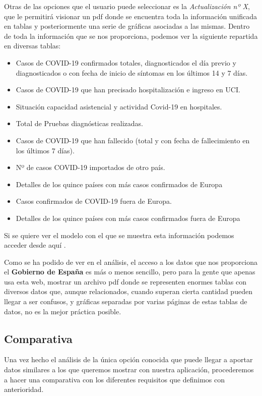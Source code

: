 Otras de las opciones que el usuario puede seleccionar es la \textit{Actualización nº X}, que le permitirá visionar un pdf donde se encuentra toda la información unificada en tablas y posteriormente una serie de gráficas asociadas a las mismas. Dentro de toda la información que se nos proporciona, podemos ver la siguiente repartida en diversas tablas:

\begin{itemize}
	\item Casos de COVID-19 confirmados totales, diagnosticados el día previo y diagnosticados o con fecha de inicio de síntomas en los últimos 14 y 7 días.
	\item Casos de COVID-19 que han precisado hospitalización e ingreso en UCI. 
	\item Situación capacidad asistencial y actividad Covid-19 en hospitales.
	\item Total de Pruebas diagnósticas realizadas.
	\item Casos de COVID-19 que han fallecido (total y con fecha de fallecimiento en los últimos 7 días).
	\item Nº de casos COVID-19 importados de otro país.
	\item Detalles de los quince países con más casos confirmados de Europa
	\item Casos confirmados de COVID-19 fuera de Europa.
	\item Detalles de los quince países con más casos confirmados fuera de Europa
\end{itemize}

Si se quiere ver el modelo con el que se muestra esta información podemos acceder desde aquí \cite{actualizacion-gob}.

Como se ha podido de ver en el análisis, el acceso a los datos que nos proporciona el \textbf{Gobierno de España} es más o menos sencillo, pero para la gente que apenas usa esta web, mostrar un archivo pdf donde se representen enormes tablas con diversos datos que, aunque relacionados, cuando superan cierta cantidad pueden llegar a ser confusos, y gráficas separadas por varias páginas de estas tablas de datos, no es la mejor práctica posible.

\subsection{Comparativa}

Una vez hecho el análisis de la única opción conocida que puede llegar a aportar datos similares a los que queremos mostrar con nuestra aplicación, procederemos a hacer una comparativa con los diferentes requisitos que definimos con anterioridad.

